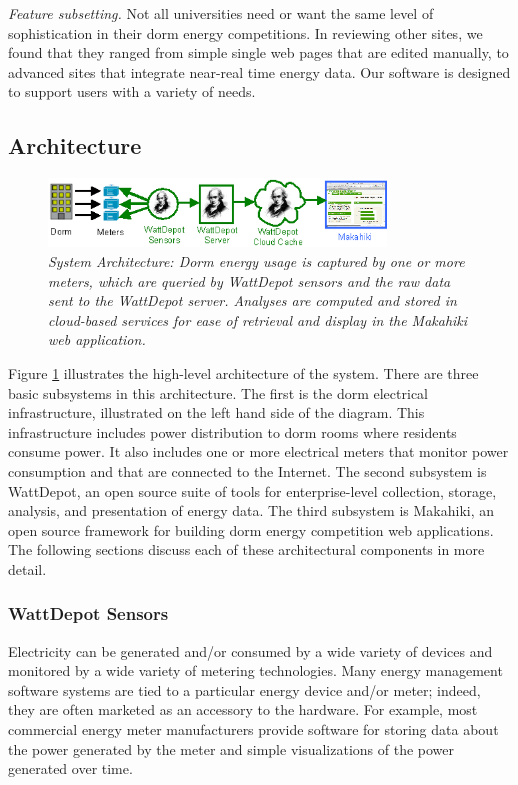 {\em Feature subsetting.} Not all universities need or want the same 
level of sophistication in their dorm energy competitions.  In reviewing 
other sites, we found that they ranged from simple single web pages that are 
edited manually, to advanced sites that integrate near-real time energy data. 
Our software is designed to support users with a variety of needs. 

\subsection{Architecture}

\begin{figure}[!th]
  \center
  \includegraphics[width=0.8\textwidth]{architecture.eps}
  \caption{\em \small System Architecture: Dorm energy usage is captured by one or more meters, which 
are queried by WattDepot sensors and the raw data sent to the WattDepot server. Analyses are computed
and stored in cloud-based services for ease of retrieval and display in the Makahiki web application.}
  \label{fig:architecture}
\end{figure} 

Figure \ref{fig:architecture} illustrates the high-level architecture of
the system. There are three basic subsystems in this architecture.  The
first is the dorm electrical infrastructure, illustrated on the left hand
side of the diagram.  This infrastructure includes power distribution to
dorm rooms where residents consume power.  It also includes one or more
electrical meters that monitor power consumption and that are connected to
the Internet.  The second subsystem is WattDepot, an open source suite of
tools for enterprise-level collection, storage, analysis,
and presentation of energy data. The third subsystem is Makahiki, an open
source framework for building dorm energy competition web applications.
The following sections discuss each of these architectural components in
more detail.

\subsubsection{WattDepot Sensors}

Electricity can be generated and/or consumed by a wide variety of devices
and monitored by a wide variety of metering technologies.  Many energy
management software systems are tied to a particular energy device and/or
meter; indeed, they are often marketed as an accessory to the hardware.
For example, most commercial energy meter manufacturers provide software
for storing data about the power generated by the meter and simple
visualizations of the power generated over time.

